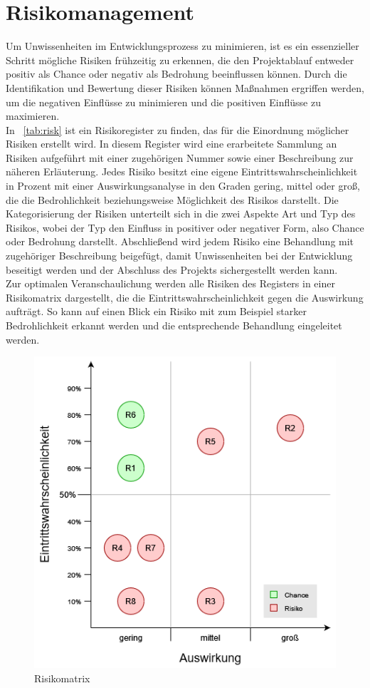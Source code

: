 \chapter{Risikomanagement}\label{ch:risikomanagement}
Um Unwissenheiten im Entwicklungsprozess zu minimieren, ist es ein essenzieller Schritt mögliche Risiken frühzeitig 
zu erkennen, die den Projektablauf entweder positiv als Chance oder negativ als Bedrohung beeinflussen können.
Durch die Identifikation und Bewertung dieser Risiken können Maßnahmen ergriffen werden, um die negativen
Einflüsse zu minimieren und die positiven Einflüsse zu maximieren. \\
\newline
In ~\autoref{tab:risk} ist ein Risikoregister zu finden, das für die Einordnung möglicher Risiken erstellt wird. 
In diesem Register wird eine erarbeitete Sammlung an Risiken aufgeführt mit einer zugehörigen Nummer sowie einer
Beschreibung zur näheren Erläuterung.
Jedes Risiko besitzt eine eigene Eintrittswahrscheinlichkeit in Prozent mit einer Auswirkungsanalyse in den Graden 
gering, mittel oder groß, die die Bedrohlichkeit beziehungsweise Möglichkeit des Risikos darstellt.
Die Kategorisierung der Risiken unterteilt sich in die zwei Aspekte Art und Typ des Risikos, wobei der Typ den Einfluss
in positiver oder negativer Form, also Chance oder Bedrohung darstellt.
Abschließend wird jedem Risiko eine Behandlung mit zugehöriger Beschreibung beigefügt, damit Unwissenheiten bei der 
Entwicklung beseitigt werden und der Abschluss des Projekts sichergestellt werden kann. \\
\newline
Zur optimalen Veranschaulichung werden alle Risiken des Registers in einer Risikomatrix dargestellt, die die
Eintrittswahrscheinlichkeit gegen die Auswirkung aufträgt.
So kann auf einen Blick ein Risiko mit zum Beispiel starker Bedrohlichkeit erkannt werden und die entsprechende 
Behandlung eingeleitet werden. \\
\begin{figure}[h]
    \centering
    \includegraphics[width=0.5\linewidth]{../bilder/risk}
    \vspace{0.05cm}
    \caption{Risikomatrix}
    \label{fig:risk}
\end{figure}